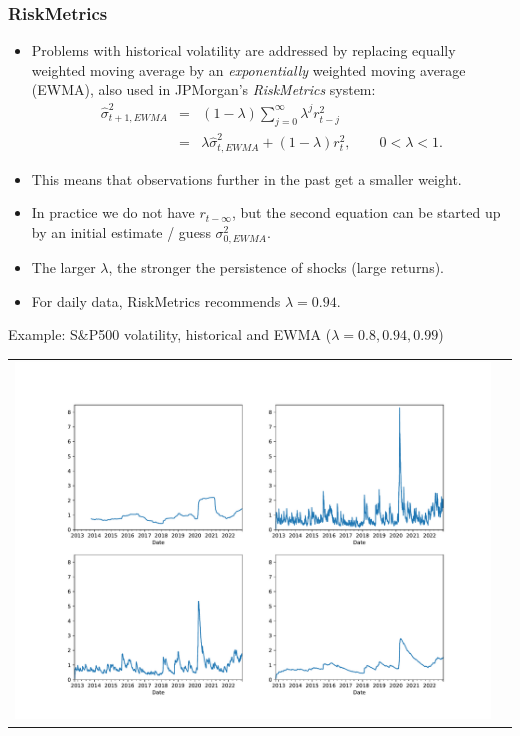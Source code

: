 \begin{frame}%

\frametitle{RiskMetrics}

\begin{itemize}
\item Problems with historical volatility are addressed by replacing equally
weigh\-ted moving average by an \emph{\color{red}exponentially} weighted
moving average (EWMA), also used in JPMorgan's \emph{\color{red}RiskMetrics}
system:%
\begin{eqnarray*}
\widehat{\sigma}_{t+1,EWMA}^{2}  &=&(1-\lambda )\sum_{j=0}^{\infty }\lambda
^{j}r_{t-j}^{2} \\
&=&\lambda\widehat{\sigma}_{t,EWMA}^{2}+(1-\lambda )r_{t}^{2},\qquad 0<\lambda <1.
\end{eqnarray*}
\item This means that observations further in the past get a smaller weight.

\item In practice we do not have $r_{t-\infty }$, but the second equation
can be started up by an initial estimate / guess $\sigma _{0,EWMA}^{2}$.
\item The larger $\lambda$, the stronger the persistence of shocks (large returns).
\item For daily data, RiskMetrics recommends $\lambda =0.94$.
\end{itemize}

\end{frame}%

\begin{frame}%

\begin{block}{Example: S\&P500 volatility, historical and EWMA ($\lambda = 0.8,0.94,0.99$)}
\begin{center}
\begin{tabular}{cc}
\includegraphics[width=.6\textwidth]{volaplots}&
\end{tabular}
\end{center}
\end{block}

\end{frame}%

